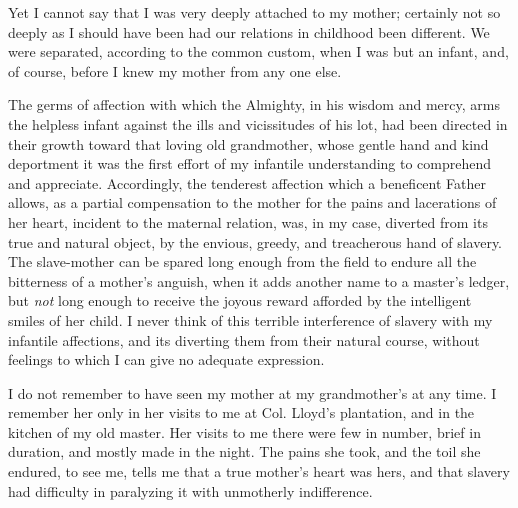 Yet I cannot say that I was very deeply attached to my mother; certainly
not so deeply as I should have been had our relations in childhood been
different. We were separated, according to the common custom, when I was
but an infant, and, of course, before I knew my mother from any one
else.

{\protect\hypertarget{53}{}{}}The germs of affection with which the
Almighty, in his wisdom and mercy, arms the helpless infant against the
ills and vicissitudes of his lot, had been directed in their growth
toward that loving old grandmother, whose gentle hand and kind
deportment it was the first effort of my infantile understanding to
comprehend and appreciate. Accordingly, the tenderest affection which a
beneficent Father allows, as a partial compensation to the mother for
the pains and lacerations of her heart, incident to the maternal
relation, was, in my case, diverted from its true and natural object, by
the envious, greedy, and treacherous hand of slavery. The slave-mother
can be spared long enough from the field to endure all the bitterness of
a mother's anguish, when it adds another name to a master's ledger, but
\emph{not} long enough to receive the joyous reward afforded by the
intelligent smiles of her child. I never think of this terrible
interference of slavery with my infantile affections, and its diverting
them from their natural course, without feelings to which I can give no
adequate expression.

I do not remember to have seen my mother at my grandmother's at any
time. I remember her only in her visits to me at Col. Lloyd's
plantation, and in the kitchen of my old master. Her visits to me there
were few in number, brief in duration, and mostly made in the night. The
pains she took, and the toil she endured, to see me, tells me that a
true mother's heart was hers, and that slavery had difficulty in
paralyzing it with unmotherly indifference.

